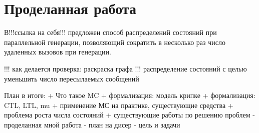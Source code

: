 \documentclass[a4paper,notitlepage,14pt]{article}
\begin{document}
\section{Проделанная работа}
\label{sec:my-work}

В!!!ссылка на себя!!! предложен способ распределений состояний при параллельной генерации,
позволяющий сократить в несколько раз число удаленных вызовов при генерации.

!!! как делается проверка: раскраска графа
!!! распределение состояний с целью уменьшить число пересылаемых сообщений

План в итоге:
+ Что такое MC
+ формализация: модель крипке
+ формализация: CTL, LTL, mu
+ применение МС на практике, существующие средства
+ проблема роста числа состояний
+ существующие работы по решению проблем
- проделанная мной работа
- план на дисер
- цель и задачи



\end{document}
